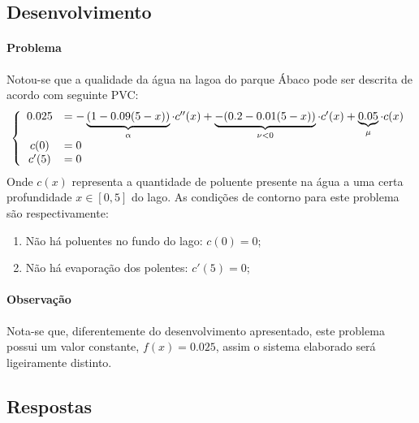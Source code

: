 \documentclass{article}
\begin{document}
    \subsection{Desenvolvimento}
        \paragraph{Problema}Notou-se que a qualidade da água na lagoa do parque Ábaco pode ser descrita de acordo com seguinte PVC:
            \[
                \left\{
                \begin{array}{c l}
                    0.025 & = - \underbrace{(1 - 0.09(5 - x))}_{\alpha}\cdot c''(x) + \underbrace{- (0.2 - 0.01(5 - x))}_{\nu < 0}\cdot c'(x) + \underbrace{0.05}_{\mu}\cdot c(x)\\
                    c(0)  & = 0\\
                    c'(5) & = 0
                \end{array}
                \right.
            \]
        Onde $c(x)$ representa a quantidade de poluente presente na água a uma certa profundidade $x \in [0, 5]$ do lago. As condições de contorno para este problema são respectivamente:
            \begin{enumerate}[noitemsep]
                \item Não há poluentes no fundo do lago: $c (0) = 0$;
                \item Não há evaporação dos polentes: $c'(5) = 0$;
            \end{enumerate}

        \paragraph{Observação}Nota-se que, diferentemente do desenvolvimento apresentado, este problema possui um valor constante, $f(x) = 0.025$, assim o sistema elaborado será ligeiramente distinto.

    \subsection{Respostas}
\end{document}
